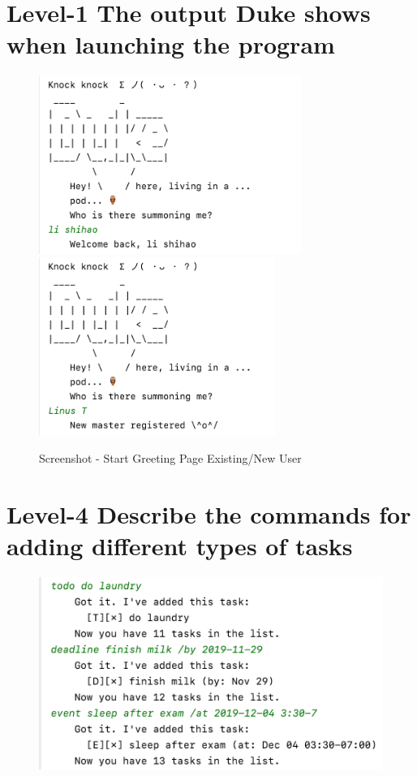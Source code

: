 \documentclass[a4paper,11pt, twoside]{article}
\begin{document}
\begin{table} [htbp]
\section* {Level-1 The output Duke shows when launching the program} 
\begin{figure}[H]
\centering
\includegraphics[height= 5.8cm]{startold.png}
\includegraphics[height= 5.8cm]{startnew.png}
\caption{Screenshot - Start Greeting Page Existing/New User} 
\label{start}
\end{figure} 


\section* {Level-4 Describe the commands for adding different types of tasks} 
\begin{figure}[H]
\left
\includegraphics[height= 6 cm]{task.png}


\end{figure}
\end{table}
\end{document}
